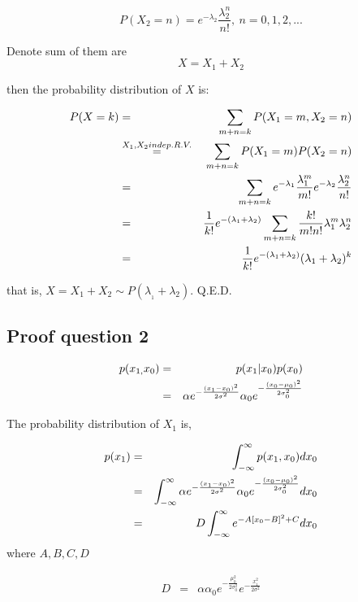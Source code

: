 \documentclass[english,11pt]{article}
\begin{document}
\begin{equation}
P(X_{2}=n)=e^{-\lambda_{2}}\frac{\lambda_{2}^{n}}{n!},\ n=0,1,2,...    
\end{equation}


Denote sum of them are 
\begin{equation}
X=X_{1}+X_{2}
\end{equation}

then the probability distribution of $X$ is:

\begin{eqnarray}
P(X=k) & = & \sum_{m+n=k}P(X_{1}=m,X_{2}=n) \notag \\
 & \overset{X_{1},X_{2}indep.R.V.}{=} & \sum_{m+n=k}P(X_{1}=m)P(X_{2}=n) \notag \\
 & = & \sum_{m+n=k}e^{-\lambda_{1}}\frac{\lambda_{1}^{m}}{m!}e^{-\lambda_{2}}\frac{\lambda_{2}^{n}}{n!} \notag \\
 & = & \frac{1}{k!}e^{-(\lambda_{1}+\lambda_{2})}\sum_{m+n=k}\frac{k!}{m!n!}\lambda_{1}^{m}\lambda_{2}^{n} \notag \\
 & = & \frac{1}{k!}e^{-(\lambda_{1}+\lambda_{2})}(\lambda_{1}+\lambda_{2})^{k}
\end{eqnarray}

that is, $X=X_{1}+X_{2}\sim P(\lambda_{_{1}}+\lambda_{2})$. Q.E.D.

\subsection{Proof question 2}

\begin{eqnarray}
p(x_{1,}x_{0}) & = & p(x_{1}|x_{0})p(x_{0}) \notag \\
 & = & \alpha e^{-\frac{(x_{1}-x_{0})^{2}}{2\sigma^{2}}}\alpha_{0}e^{-\frac{(x_{0}-\mu_{0})^{2}}{2\sigma_{0}^{2}}}
\end{eqnarray}

The probability distribution of $X_{1}$ is,

\begin{eqnarray}
p(x_{1}) & = & \int_{-\infty}^{\infty}p(x_{1},x_{0})dx_{0} \notag \\
 & = & \int_{-\infty}^{\infty}\alpha e^{-\frac{(x_{1}-x_{0})^{2}}{2\sigma^{2}}}\alpha_{0}e^{-\frac{(x_{0}-\mu_{0})^{2}}{2\sigma_{0}^{2}}}dx_{0} \notag \\
 & = & D\int_{-\infty}^{\infty}e^{-A[x_{0}-B]^{2}+C}dx_{0}
\end{eqnarray}
where $A,B,C,D$

\begin{eqnarray}
D & = & \alpha\alpha_{0}e^{-\frac{\mu_{0}^{2}}{2\sigma_{0}^{2}}}e^{-\frac{x_{1}^{2}}{2\sigma^{2}}}
\end{eqnarray}
\end{document}
